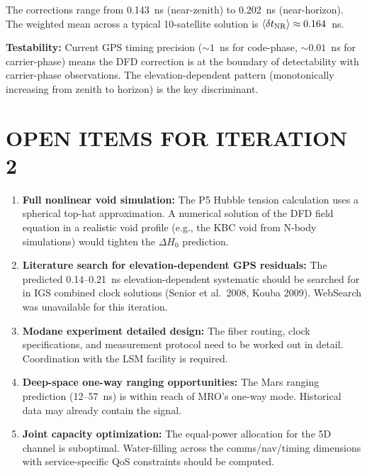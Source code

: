 \documentclass[aps,prd,twocolumn,superscriptaddress,nofootinbib]{revtex4-2}
\begin{document}
The corrections range from 0.143~ns (near-zenith) to 0.202~ns
(near-horizon).  The weighted mean across a typical 10-satellite
solution is $\langle\delta t_{\rm NR}\rangle \approx 0.164$~ns.

\textbf{Testability:}  Current GPS timing precision ($\sim 1$~ns for
code-phase, $\sim 0.01$~ns for carrier-phase) means the DFD correction
is at the boundary of detectability with carrier-phase observations.
The elevation-dependent pattern (monotonically increasing from zenith
to horizon) is the key discriminant.

\section{OPEN ITEMS FOR ITERATION 2}

\begin{enumerate}
\item \textbf{Full nonlinear void simulation:}  The P5 Hubble tension
calculation uses a spherical top-hat approximation.  A numerical solution
of the DFD field equation in a realistic void profile (e.g., the KBC
void from N-body simulations) would tighten the $\Delta H_0$ prediction.

\item \textbf{Literature search for elevation-dependent GPS residuals:}
The predicted 0.14--0.21~ns elevation-dependent systematic should be
searched for in IGS combined clock solutions (Senior et al.\ 2008,
Kouba 2009).  WebSearch was unavailable for this iteration.

\item \textbf{Modane experiment detailed design:}  The fiber routing,
clock specifications, and measurement protocol need to be worked out
in detail.  Coordination with the LSM facility is required.

\item \textbf{Deep-space one-way ranging opportunities:}  The Mars
ranging prediction (12--57~ns) is within reach of MRO's one-way mode.
Historical data may already contain the signal.

\item \textbf{Joint capacity optimization:}  The equal-power allocation
for the 5D channel is suboptimal.  Water-filling across the
comms/nav/timing dimensions with service-specific QoS constraints
should be computed.
\end{enumerate}
\end{document}
